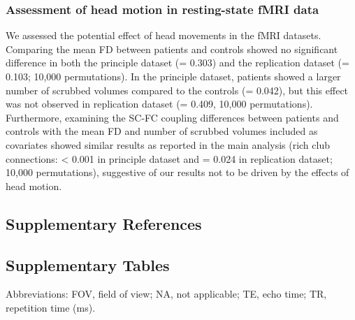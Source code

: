 \begin{refsection}
\subsubsection{Assessment of head motion in resting-state fMRI data}
We assessed the potential effect of head movements in the fMRI datasets. Comparing the mean FD between patients and controls showed no significant difference in both the principle dataset (\pval = 0.303) and the replication dataset (\pval = 0.103; 10,000 permutations). In the principle dataset, patients showed a larger number of scrubbed volumes compared to the controls (\pval = 0.042), but this effect was not observed in replication dataset (\pval = 0.409, 10,000 permutations). Furthermore, examining the SC-FC coupling differences between patients and controls with the mean FD and number of scrubbed volumes included as covariates showed similar results as reported in the main analysis (rich club connections: \pval < 0.001 in principle dataset and \pval = 0.024 in replication dataset; 10,000 permutations), suggestive of our results not to be driven by the effects of head motion.

\subsection*{Supplementary References}
\printbibliography[heading=none]

\newpage
\subsection*{Supplementary Tables}

\scriptsize
{} \label{tableS1:MRI} 
\bigskip
\scriptsize Abbreviations: FOV, field of view; NA, not applicable; TE, echo time; TR, repetition time (ms).


\end{refsection}
